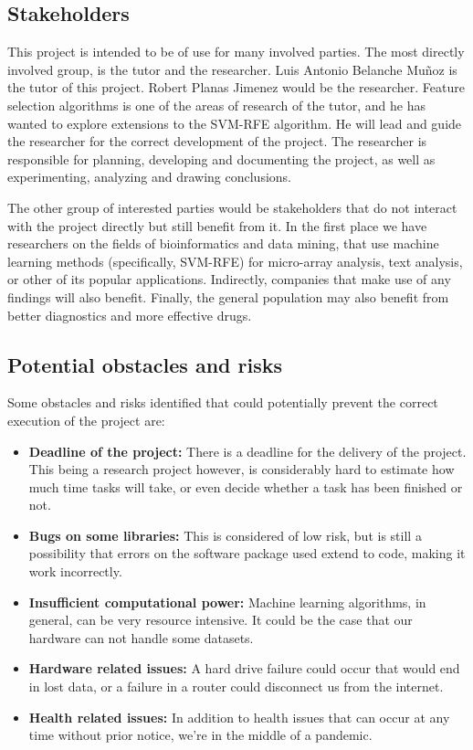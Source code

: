 
\subsection{Stakeholders}

This project is intended to be of use for many involved parties. The most directly involved group, is the tutor and the researcher. Luis Antonio Belanche Muñoz is the tutor of this project. Robert Planas Jimenez would be the researcher. Feature selection algorithms is one of the areas of research of the tutor, and he has wanted to explore extensions to the SVM-RFE algorithm. He will lead and guide the researcher for the correct development of the project. The researcher is responsible for planning, developing and documenting the project, as well as experimenting, analyzing and drawing conclusions.

The other group of interested parties would be stakeholders that do not interact with the project directly but still benefit from it. In the first place we have researchers on the fields of bioinformatics and data mining, that use machine learning methods (specifically, SVM-RFE) for micro-array analysis, text analysis, or other of its popular applications. Indirectly, companies that make use of any findings will also benefit. Finally, the general population may also benefit from better diagnostics and more effective drugs. 

\label{sec:risk}
\subsection{Potential obstacles and risks}

Some obstacles and risks identified that could potentially prevent the correct exec\-ution of the project are:

\begin{itemize}
    \item \textbf{Deadline of the project:} There is a deadline for the delivery of the project. This being a research project however, is considerably hard to estimate how much time tasks will take, or even decide whether a task has been finished or not.
    \item \textbf{Bugs on some libraries:} This is considered of low risk, but is still a possibility that errors on the software package used extend to code, making it work in\-correctly.
    \item \textbf{Insufficient computational power:} Machine learning algorithms, in general, can be very resource intensive. It could be the case that our hardware can not handle some datasets. 
    \item \textbf{Hardware related issues:} A hard drive failure could occur that would end in lost data, or a failure in a router could disconnect us from the internet.
    \item \textbf{Health related issues:} In addition to health issues that can occur at any time without prior notice, we're in the middle of a pandemic.
\end{itemize}


